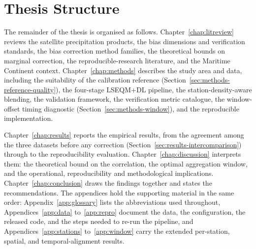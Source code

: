 \section{Thesis Structure}\label{sec:intro-structure}

The remainder of the thesis is organised as follows.
Chapter~\ref{chap:litreview} reviews the satellite precipitation
products, the bias dimensions and verification standards, the
bias correction method families, the theoretical bounds on
marginal correction, the reproducible-research literature, and
the Maritime Continent context.
Chapter~\ref{chap:methods} describes the study area and data,
including the suitability of the calibration reference
(Section~\ref{sec:methods-reference-quality}), the four-stage
LSEQM+DL pipeline, the station-density-aware blending, the
validation framework, the verification metric catalogue, the
window-offset timing diagnostic
(Section~\ref{sec:methods-window}), and the reproducible
implementation.

Chapter~\ref{chap:results} reports the empirical results, from the
agreement among the three datasets before any correction
(Section~\ref{sec:results-intercomparison}) through to the
reproducibility evaluation.
Chapter~\ref{chap:discussion} interprets them: the theoretical bound
on the correlation, the optimal aggregation window, and the
operational, reproducibility and methodological implications.
Chapter~\ref{chap:conclusion} draws the findings together and
states the recommendations.
The appendices hold the supporting material in the same order:
Appendix~\ref{app:glossary} lists the abbreviations used
throughout, Appendices~\ref{app:data} to~\ref{app:repro} document
the data, the configuration, the released code, and the steps
needed to re-run the pipeline, and
Appendices~\ref{app:stations} to~\ref{app:window} carry the
extended per-station, spatial, and temporal-alignment results.
